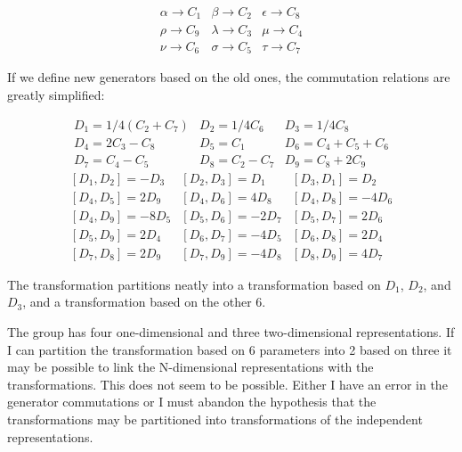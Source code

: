 \documentclass[12pt]{article}
\begin{document}
\begin{displaymath}
\begin{array}{ccc}
\alpha \rightarrow C_1& \beta \rightarrow C_2& \epsilon \rightarrow C_8\\
\rho \rightarrow C_9& \lambda \rightarrow C_3& \mu \rightarrow C_4\\
\nu \rightarrow C_6& \sigma \rightarrow C_5& \tau \rightarrow C_7
\end{array}
\end{displaymath}

If we define new generators based on the old ones, the commutation
relations are greatly simplified:

\begin{displaymath}
\begin{array}{ccc}
D_1 = 1/4 \left( C_2 + C_7 \right) & D_2 = 1/4 C_6 & D_3 = 1/4 C_8 \\
D_4 = 2 C_3 - C_8 & D_5 = C_1 & D_6 = C_4 + C_5 + C_6 \\
D_7 = C_4 - C_5 & D_8 = C_2 - C_7 & D_9 = C_8 + 2 C_9
\end{array}
\end{displaymath}
\begin{displaymath}
\begin{array}{ccc}
\left[ D_1, D_2 \right] = -D_3 & \left[ D_2 , D_3 \right] = D_1  &  \left[ D_3 , D_1 \right] = D_2 \\
\left[ D_4, D_5 \right] = 2 D_9 & \left[ D_4 , D_6 \right] = 4 D_8  &  \left[ D_4 , D_8 \right] = -4 D_6 \\
\left[ D_4, D_9 \right] = -8 D_5 & \left[ D_5 , D_6 \right] = -2 D_7  &  \left[ D_5 , D_7 \right] = 2 D_6 \\
\left[ D_5, D_9 \right] = 2 D_4 & \left[ D_6 , D_7 \right] = -4 D_5  &  \left[ D_6 , D_8 \right] = 2 D_4 \\
\left[ D_7, D_8 \right] = 2 D_9 & \left[ D_7 , D_9 \right] = -4 D_8  &  \left[ D_8 , D_9 \right] = 4 D_7 
\end{array}
\end{displaymath}

The transformation partitions neatly into a transformation based on
$D_1$, $D_2$, and $D_3$, and a transformation based on the other 6.

The group has four one-dimensional and three two-dimensional representations.
If I can partition the transformation based on 6 parameters into 2 based
on three it may be possible to link the N-dimensional representations with
the transformations.  This does not seem to be possible.  Either
I have an error in the generator commutations or I must abandon the
hypothesis that
the transformations may be partitioned into transformations of the independent
representations.
\end{document}
